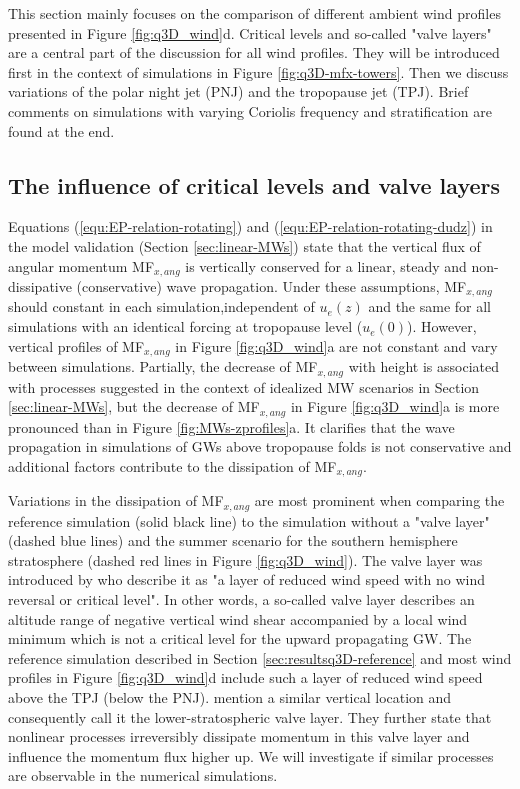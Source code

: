 %
This section mainly focuses on the comparison of different ambient wind profiles presented in Figure \ref{fig:q3D_wind}d. Critical levels and so-called "valve layers" are a central part of the discussion for all wind profiles. They will be introduced first in the context of simulations in Figure \ref{fig:q3D-mfx-towers}. Then we discuss variations of the polar night jet (PNJ) and the tropopause jet (TPJ). Brief comments on simulations with varying Coriolis frequency and stratification are found at the end.

\subsection*{The influence of critical levels and valve layers}
Equations (\ref{equ:EP-relation-rotating}) and (\ref{equ:EP-relation-rotating-dudz}) in the model validation (Section \ref{sec:linear-MWs}) state that the vertical flux of angular momentum MF$_{x,ang}$ is vertically conserved for a linear, steady and non-dissipative (conservative) wave propagation. Under these assumptions, MF$_{x,ang}$ should constant in each simulation,independent of $u_e(z)$ and the same for all simulations with an identical forcing at tropopause level ($u_e(0)$). However, vertical profiles of MF$_{x,ang}$ in Figure \ref{fig:q3D_wind}a are not constant and vary between simulations. Partially, the decrease of MF$_{x,ang}$ with height is associated with processes suggested in the context of idealized MW scenarios in Section \ref{sec:linear-MWs}, but the decrease of MF$_{x,ang}$ in Figure \ref{fig:q3D_wind}a is more pronounced than in Figure \ref{fig:MWs-zprofiles}a. It clarifies that the wave propagation in simulations of GWs above tropopause folds is not conservative and additional factors contribute to the dissipation of MF$_{x,ang}$.

Variations in the dissipation of MF$_{x,ang}$ are most prominent when comparing the reference simulation (solid black line) to the simulation without a "valve layer" (dashed blue lines) and the summer scenario for the southern hemisphere stratosphere (dashed red lines in Figure \ref{fig:q3D_wind}). The valve layer was introduced by \textcite[]{kruse_midlatitude_2016} who describe it as "a layer of reduced wind speed with no wind reversal or critical level". In other words, a so-called valve layer describes an altitude range of negative vertical wind shear accompanied by a local wind minimum which is not a critical level for the upward propagating GW. The reference simulation described in Section \ref{sec:resultsq3D-reference} and most wind profiles in Figure \ref{fig:q3D_wind}d include such a layer of reduced wind speed above the TPJ (below the PNJ).  \textcite[]{kruse_midlatitude_2016} mention a similar vertical location and consequently call it the lower-stratospheric valve layer. They further state that nonlinear processes irreversibly dissipate momentum in this valve layer and influence the momentum flux higher up. We will investigate if similar processes are observable in the numerical simulations.


